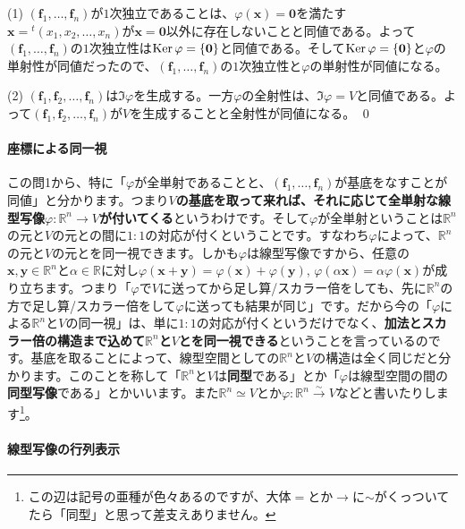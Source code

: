 \noindent (1) $(\bm{f}_1, \ldots, \bm{f}_n)$が$1$次独立であることは、$\varphi(\bm{x}) = \bm{0}$を満たす$\bm{x} = {}^t(x_1, x_2, \ldots, x_n)$が$\bm{x} = \bm{0}$以外に存在しないことと同値である。よって$(\bm{f}_1, \ldots, \bm{f}_n)$の$1$次独立性は$\operatorname{Ker} \varphi = \{\boldsymbol{0}\}$と同値である。そして$\operatorname{Ker} \varphi = \{\boldsymbol{0}\}$と$\varphi$の単射性が同値だったので、$(\bm{f}_1, \ldots, \bm{f}_n)$の$1$次独立性と$\varphi$の単射性が同値になる。

\noindent (2) $(\bm{f}_1, \bm{f}_2, \ldots, \bm{f}_n)$は$\Im \varphi$を生成する。一方$\varphi$の全射性は、$\Im \varphi = V$と同値である。よって$(\bm{f}_1, \bm{f}_2, \ldots, \bm{f}_n)$が$V$を生成することと全射性が同値になる。 \qed

\paragraph{座標による同一視}

この問1から、特に「$\varphi$が全単射であることと、$(\bm{f}_1, \ldots, \bm{f}_n)$が基底をなすことが同値」と分かります。つまり\textbf{$V$の基底を取って来れば、それに応じて全単射な線型写像$\varphi\colon\mathbb{R}^n \rightarrow V$が付いてくる}というわけです。そして$\varphi$が全単射ということは$\mathbb{R}^n$の元と$V$の元との間に$1:1$の対応が付くということです。すなわち$\varphi$によって、$\mathbb{R}^n$の元と$V$の元とを同一視できます。しかも$\varphi$は線型写像ですから、任意の$\bm{x}, \bm{y}\in \mathbb{R}^n$と$\alpha \in \mathbb{R}$に対し$\varphi(\bm{x} + \bm{y}) = \varphi(\bm{x}) + \varphi(\bm{y})$, $\varphi(\alpha\bm{x}) = \alpha \varphi(\bm{x})$が成り立ちます。つまり「$\varphi$で$V$に送ってから足し算/スカラー倍をしても、先に$\mathbb{R}^n$の方で足し算/スカラー倍をして$\varphi$に送っても結果が同じ」です。だから今の「$\varphi$による$\mathbb{R}^n$と$V$の同一視」は、単に$1:1$の対応が付くというだけでなく、\textbf{加法とスカラー倍の構造まで込めて$\mathbb{R}^n$と$V$とを同一視できる}ということを言っているのです。基底を取ることによって、線型空間としての$\mathbb{R}^n$と$V$の構造は全く同じだと分かります。このことを称して「$\mathbb{R}^n$と$V$は\textbf{同型}である」とか「$\varphi$は線型空間の間の\textbf{同型写像}である」とかいいます。また$\mathbb{R}^n \simeq V$とか$\varphi\colon\mathbb{R}^n\xrightarrow{\sim}V$などと書いたりします\footnote{この辺は記号の亜種が色々あるのですが、大体$=$とか$\rightarrow$に$\sim$がくっついてたら「同型」と思って差支えありません。}。

\paragraph{線型写像の行列表示}

